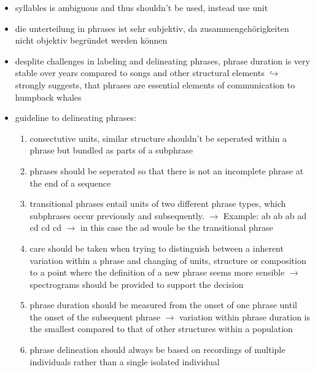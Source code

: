 \documentclass[12pt,a4paper]{article}
\begin{document}
\begin{itemize}
  \item syllables is ambiguous and thus shouldn't be used, instead use unit
  \item die unterteilung in phrases ist sehr subjektiv, da zusammengehörigkeiten nicht objektiv begründet werden können
  \item desplite challenges in labeling and delineating phrases, phrase duration is very stable over years compared to songs and other structural elements
  \newline \indent $\hookrightarrow$ strongly suggests, that phrases are essential elements of communication to humpback whales

  \item guideline to delineating phrases:
  \begin{enumerate} 
    \item consectutive units, similar structure shouldn't be seperated within a phrase but bundled as parts of a subphrase
    \item phrases should be seperated so that there is not an incomplete phrase at the end of a sequence
    \item transitional phrases entail units of two different phrase types, which subphrases occur previously and subsequently. 
      \newline \indent $\longrightarrow$ Example: ab ab ab ad cd cd cd
      \newline \indent $\longrightarrow$ in this case the ad woule be the transitional phrase
    \item care should be taken when trying to distinguish between a inherent variation within a phrase and changing of units, structure or composition to a point where the definition of a new phrase seems more sensible
      \newline \indent $\longrightarrow$ spectrograms should be provided to support the decision
    \item phrase duration should be measured from the onset of one phrase until the onset of the subsequent phrase
      \newline \indent $\longrightarrow$ variation within phrase duration is the smallest compared to that of other structures within a population
    \item phrase delineation should always be based on recordings of multiple individuals rather than a single isolated individual 
  \end{enumerate}


\end{itemize}
\end{document}
